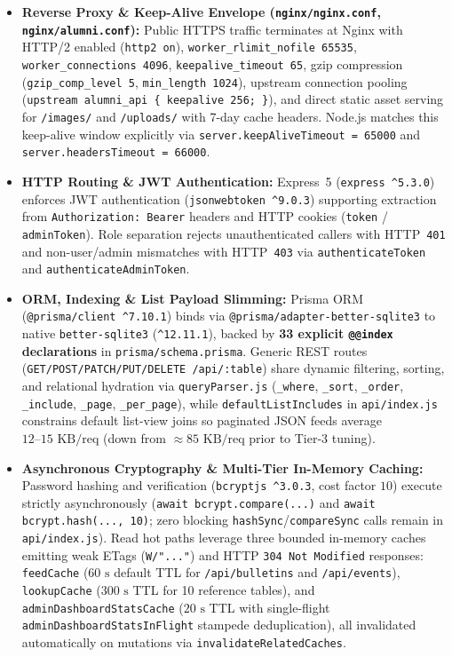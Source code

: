 \documentclass[11pt,letterpaper]{article}
\begin{document}
\begin{itemize}
  \item \textbf{Reverse Proxy \& Keep-Alive Envelope (\texttt{nginx/nginx.conf}, \texttt{nginx/alumni.conf}):} Public HTTPS traffic terminates at Nginx with HTTP/2 enabled (\texttt{http2 on}), \texttt{worker\_rlimit\_nofile 65535}, \texttt{worker\_connections 4096}, \texttt{keepalive\_timeout 65}, gzip compression (\texttt{gzip\_comp\_level 5}, \texttt{min\_length 1024}), upstream connection pooling (\texttt{upstream alumni\_api \{ keepalive 256; \}}), and direct static asset serving for \texttt{/images/} and \texttt{/uploads/} with 7-day cache headers. Node.js matches this keep-alive window explicitly via \texttt{server.keepAliveTimeout = 65000} and \texttt{server.headersTimeout = 66000}.
  \item \textbf{HTTP Routing \& JWT Authentication:} Express~5 (\texttt{express \^{}5.3.0}) enforces JWT authentication (\texttt{jsonwebtoken \^{}9.0.3}) supporting extraction from \texttt{Authorization: Bearer} headers and HTTP cookies (\texttt{token} / \texttt{adminToken}). Role separation rejects unauthenticated callers with HTTP~\texttt{401} and non-user/admin mismatches with HTTP~\texttt{403} via \texttt{authenticateToken} and \texttt{authenticateAdminToken}.
  \item \textbf{ORM, Indexing \& List Payload Slimming:} Prisma ORM (\texttt{@prisma/client \^{}7.10.1}) binds via \texttt{@prisma/adapter-better-sqlite3} to native \texttt{better-sqlite3} (\texttt{\^{}12.11.1}), backed by \textbf{33 explicit \texttt{@@index} declarations} in \texttt{prisma/schema.prisma}. Generic REST routes (\texttt{GET/\allowbreak POST/\allowbreak PATCH/\allowbreak PUT/\allowbreak DELETE /api/:table}) share dynamic filtering, sorting, and relational hydration via \texttt{queryParser.js} (\texttt{\_where}, \texttt{\_sort}, \texttt{\_order}, \texttt{\_include}, \texttt{\_page}, \texttt{\_per\_page}), while \texttt{defaultListIncludes} in \texttt{api/index.js} constrains default list-view joins so paginated JSON feeds average $12\text{--}15\text{ KB/req}$ (down from $\approx 85\text{ KB/req}$ prior to Tier-3 tuning).
  \item \textbf{Asynchronous Cryptography \& Multi-Tier In-Memory Caching:} Password hashing and verification (\texttt{bcryptjs \^{}3.0.3}, cost factor $10$) execute strictly asynchronously (\texttt{await bcrypt.compare(...)} and \texttt{await bcrypt.hash(..., 10)}; zero blocking \texttt{hashSync}/\texttt{compareSync} calls remain in \texttt{api/index.js}). Read hot paths leverage three bounded in-memory caches emitting weak ETags (\texttt{W/"..."}) and HTTP \texttt{304 Not Modified} responses: \texttt{feedCache} ($60\text{ s}$ default TTL for \texttt{/api/bulletins} and \texttt{/api/events}), \texttt{lookupCache} ($300\text{ s}$ TTL for 10 reference tables), and \texttt{adminDashboardStatsCache} ($20\text{ s}$ TTL with single-flight \texttt{adminDashboardStatsInFlight} stampede deduplication), all invalidated automatically on mutations via \texttt{invalidateRelatedCaches}.

\end{itemize}
\end{document}
